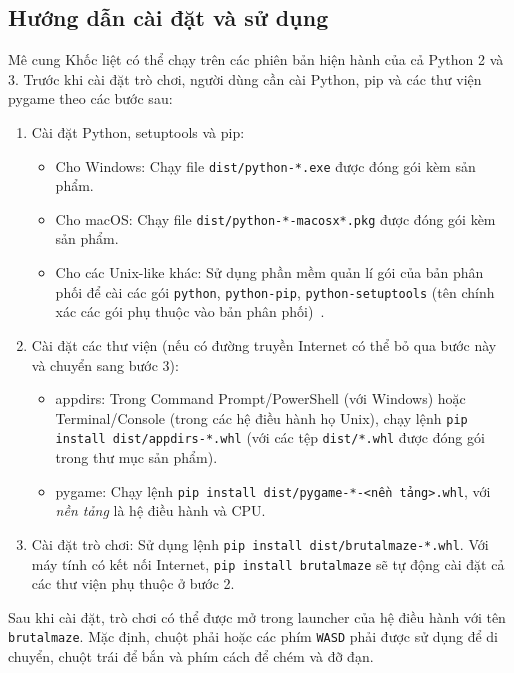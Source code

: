 \documentclass[a4paper,12pt]{article}
\begin{document}
\subsection{Hướng dẫn cài đặt và sử dụng}
Mê cung Khốc liệt có thể chạy trên các phiên bản hiện hành của cả Python 2 và
3. Trước khi cài đặt trò chơi, người dùng cần cài Python, pip và các thư viện
pygame theo các bước sau:
\begin{enumerate}
  \item Cài đặt Python, setuptools và pip:
    \begin{itemize}
      \item Cho Windows: Chạy file \verb|dist/python-*.exe| được đóng gói kèm
        sản phẩm.
      \item Cho macOS: Chạy file \verb|dist/python-*-macosx*.pkg| được đóng gói
        kèm sản phẩm.
      \item Cho các Unix-like khác: Sử dụng phần mềm quản lí gói của bản phân
        phối để cài các gói \verb|python|, \verb|python-pip|,
        \verb|python-setuptools| (tên chính xác các gói phụ thuộc vào bản phân
        phối)~\cite{nixpip}.
    \end{itemize}
  \item Cài đặt các thư viện (nếu có đường truyền Internet có thể bỏ qua bước
    này và chuyển sang bước 3):
    \begin{itemize}
      \item appdirs: Trong Command Prompt/PowerShell (với Windows) hoặc
        \mbox{Terminal/Console} (trong các hệ điều hành họ Unix), chạy lệnh
        \verb|pip install dist/appdirs-*.whl| (với các tệp \verb|dist/*.whl|
        được đóng gói trong thư mục sản phẩm).
      \item pygame: Chạy lệnh \verb|pip install dist/pygame-*-<nền tảng>.whl|,
        với \emph{nền tảng} là hệ điều hành và CPU.
    \end{itemize}
  \item Cài đặt trò chơi: Sử dụng lệnh \verb|pip install dist/brutalmaze-*.whl|.
    Với máy tính có kết nối Internet, \verb|pip install brutalmaze| sẽ tự động
    cài đặt cả các thư viện phụ thuộc ở bước 2.
\end{enumerate}

Sau khi cài đặt, trò chơi có thể được mở trong launcher của hệ điều hành với
tên \verb|brutalmaze|. Mặc định, chuột phải hoặc các phím \verb|WASD| phải được
sử dụng để di chuyển, chuột trái để bắn và phím cách để chém và đỡ đạn.
\end{document}
